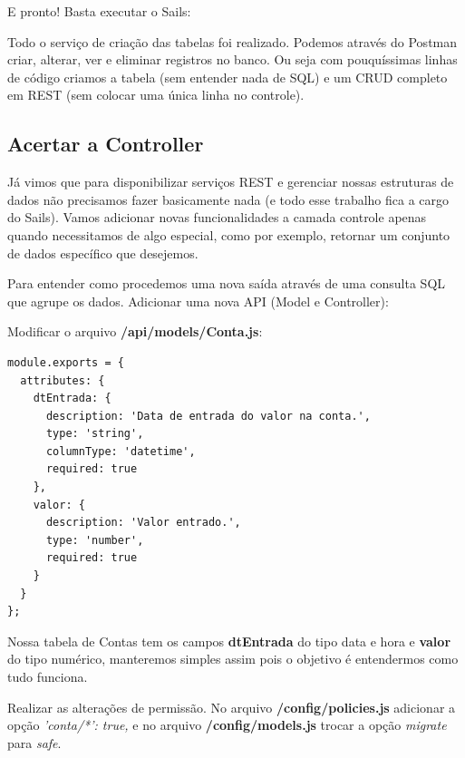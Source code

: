 \documentclass[a4paper,11pt]{article}
\begin{document}
E pronto! Basta executar o Sails: \\

Todo o serviço de criação das tabelas foi realizado. Podemos através do Postman criar, alterar, ver e eliminar registros no banco. Ou seja com pouquíssimas linhas de código criamos a tabela (sem entender nada de SQL) e um CRUD completo em REST (sem colocar uma única linha no controle).

\subsection{Acertar a Controller}
Já vimos que para disponibilizar serviços REST e gerenciar nossas estruturas de dados não precisamos fazer basicamente nada (e todo esse trabalho fica a cargo do Sails). Vamos adicionar novas funcionalidades a camada controle apenas quando necessitamos de algo especial, como por exemplo, retornar um conjunto de dados específico que desejemos.

Para entender como procedemos uma nova saída através de uma consulta SQL que agrupe os dados. Adicionar uma nova API (Model e Controller): \\

Modificar o arquivo \textbf{/api/models/Conta.js}:
\begin{lstlisting}
module.exports = {
  attributes: {
    dtEntrada: {
      description: 'Data de entrada do valor na conta.',
      type: 'string',
      columnType: 'datetime',
      required: true
    },
    valor: {
      description: 'Valor entrado.',
      type: 'number',
      required: true
    }
  }
};
\end{lstlisting}

Nossa tabela de Contas tem os campos \textbf{dtEntrada} do tipo data e hora e \textbf{valor} do tipo numérico, manteremos simples assim pois o objetivo é entendermos como tudo funciona. 

Realizar as alterações de permissão. No arquivo \textbf{/config/policies.js} adicionar a opção \textit{'conta/*': true,} e no arquivo \textbf{/config/models.js} trocar a opção \textit{migrate} para \textit{safe}.
\end{document}
